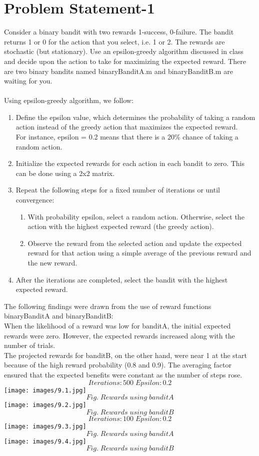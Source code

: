 \documentclass[conference]{IEEEtran}
\begin{document}
\section{Problem Statement-1} 
Consider a binary bandit with two rewards 1-success, 0-failure. The bandit returns 1 or 0 for the action that you select, i.e. 1 or 2. The rewards are stochastic (but stationary). Use an epsilon-greedy algorithm discussed in class and decide upon the action to take for maximizing the expected reward. There are two binary bandits named binaryBanditA.m and binaryBanditB.m are waiting for you.\\
\\
Using epsilon-greedy algorithm, we follow:
\begin{enumerate}
    \item Define the epsilon value, which determines the probability of taking a random action instead of the greedy action that maximizes the expected reward. \\
    For instance, epsilon = 0.2 means that there is a 20\% chance of taking a random action. \\
    \item Initialize the expected rewards for each action in each bandit to zero. This can be done using a 2x2 matrix. \\
    \item Repeat the following steps for a fixed number of iterations or until convergence:
    \begin{enumerate}
    \item With probability epsilon, select a random action. Otherwise, select the action with the highest expected reward (the greedy action).
    \item Observe the reward from the selected action and update the expected reward for that action using a simple average of the previous reward and the new reward.
    \end{enumerate} 
    \item After the iterations are completed, select the bandit with the highest expected reward.
\end{enumerate} 
The following findings were drawn from the use of reward functions binaryBanditA and binaryBanditB: \\
When the likelihood of a reward was low for banditA, the initial expected rewards were zero. However, the expected rewards increased along with the number of trials. \\
The projected rewards for banditB, on the other hand, were near 1 at the start because of the high reward probability (0.8 and 0.9). The averaging factor ensured that the expected benefits were constant as the number of steps rose.
$$Iterations:500\; Epsilon:0.2$$
\texttt{[image: images/9.1.jpg]}
$$Fig. \; Rewards \; using \; banditA$$
\texttt{[image: images/9.2.jpg]}
$$Fig. \; Rewards \; using \; banditB$$
$$Iterations:100\; Epsilon:0.2$$
\texttt{[image: images/9.3.jpg]}
$$Fig. \; Rewards \; using \; banditA$$
\texttt{[image: images/9.4.jpg]}
$$Fig. \; Rewards \; using \; banditB$$
\end{document}
